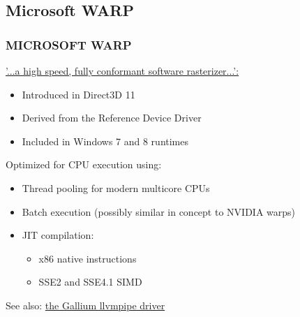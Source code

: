 \subsection{Microsoft WARP}
\begin{frame}
\frametitle{MICROSOFT WARP}

\href{http://msdn.microsoft.com/en-us/library/windows/desktop/gg615082(v=vs.85)%
  .aspx}{'...a high speed, fully conformant software rasterizer...':}
\begin{itemize}
\item Introduced in Direct3D 11
\item Derived from the Reference Device Driver
\item Included in Windows 7 and 8 runtimes
\end{itemize}

Optimized for CPU execution using:
\begin{itemize}
\item Thread pooling for modern multicore CPUs
\item Batch execution (possibly similar in concept to NVIDIA warps)
\item JIT compilation:
  \begin{itemize}
  \item x86 native instructions
  \item SSE2 and SSE4.1 SIMD
  \end{itemize}
\end{itemize}

See also: \href{http://www.mesa3d.org/llvmpipe.html}{the Gallium llvmpipe driver}

\end{frame}
